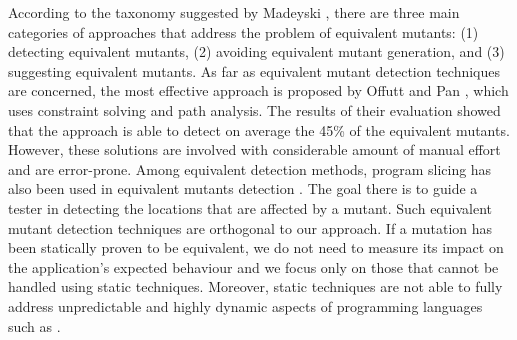 According to the taxonomy suggested by Madeyski \etal \cite{madeyski:tse13}, there are three main categories of approaches that address the problem of equivalent mutants: (1) detecting equivalent mutants, (2) avoiding equivalent mutant generation, and (3) suggesting equivalent mutants. As far as equivalent mutant detection techniques are concerned, 
the most effective approach is proposed by
Offutt and Pan \cite{offutt:tvr97, offutt:compass96}, which uses constraint
solving and path analysis. The results of their evaluation showed that the approach is able to detect on average the 45\% of the equivalent mutants. 
However, these solutions are involved with considerable amount of manual effort and are error-prone.
Among equivalent detection methods, program slicing has also been used in equivalent mutants detection \cite{hieron:tvr99}. %
The goal there is to guide a tester in detecting the locations that are affected by a mutant.
Such equivalent mutant detection techniques are orthogonal to our approach. If a mutation has been statically proven to be equivalent, we do not need to measure its impact on the application's expected behaviour and we focus only on  those that cannot be handled using static techniques. Moreover, static  techniques are not able to fully address unpredictable and highly dynamic aspects of programming languages such as \javascript.

